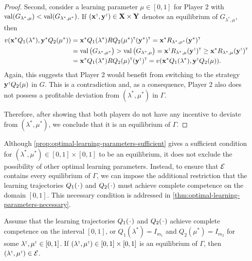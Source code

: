 \begin{proof}
        Second, consider a learning parameter $\mu \in [0, 1]$ for Player 2 with $\operatorname{val}(G_{\lambda^*, \mu}) < \operatorname{val}(G_{\lambda^*, \mu^*})$.
        If $(\vec{x}^\sdagger, \vec{y}^\sdagger) \in \vec{X} \times \vec{Y}$ denotes an equilibrium of $G_{\lambda^*, \mu}$, then
        \begin{equation} \label{temp:optimal-learning-parameters-sufficient-2}
        \begin{split}
            v(\vec{x}^* Q_1(\lambda^*), \vec{y}^* Q_2(\mu^*))
                & = \vec{x}^* Q_1(\lambda^*) R Q_2(\mu^*)^\transp (\vec{y}^*)^\transp
                = \vec{x}^* R_{\lambda^*, \mu^*} (\vec{y}^*)^\transp \\
                & = \val\big(G_{\lambda^*, \mu^*}\big)
                > \val\big(G_{\lambda^*, \mu}\big)
                = \vec{x}^\sdagger R_{\lambda^*, \mu} (\vec{y}^\sdagger)^\transp
                \ge \vec{x}^* R_{\lambda^*, \mu} (\vec{y}^\sdagger)^\transp \\
                & = \vec{x}^* Q_1(\lambda^*) R Q_2(\mu)^\transp (\vec{y}^\sdagger)^\transp
                = v(\vec{x}^* Q_1(\lambda^*), \vec{y}^\sdagger Q_2(\mu)).
        \end{split}
        \end{equation}
        Again, this suggests that Player 2 would benefit from switching to the strategy $\vec{y}^\sdagger Q_2(\mu)$ in $G$.
        This is a contradiction and, as a consequence, Player 2 also does not possess a profitable deviation from $(\lambda^*, \mu^*)$ in $\Gamma$.

        Therefore, after showing that both players do not have any incentive to deviate from $(\lambda^*, \mu^*)$, we conclude that it is an equilibrium of $\Gamma$.
    \end{proof}

    Although \autoref{prop:optimal-learning-parameters-sufficient} gives a sufficient condition for $(\lambda^*, \mu^*) \in [0, 1] \times [0, 1]$ to be an equilibrium, it does not exclude the possibility of other optimal learning parameters.
    Instead, to ensure that $\mathcal{E}$ contains every equilibrium of $\Gamma$, we can impose the additional restriction that the learning trajectories $Q_1(\funcdot)$ and $Q_2(\funcdot)$ must achieve complete competence on the domain $[0, 1]$.
    This necessary condition is addressed in \autoref{thm:optimal-learning-parameters-necessary}.

    \begin{theorem} \label{thm:optimal-learning-parameters-necessary}
        Assume that the learning trajectories $Q_1(\funcdot)$ and $Q_2(\funcdot)$ achieve complete competence on the interval $[0, 1]$, or $Q_1(\lambda^*) = I_{m_1}$ and $Q_2(\mu^*) = I_{m_2}$ for some $\lambda^\sdagger, \mu^\sdagger \in [0, 1]$.
        If $(\lambda^\sdagger, \mu^\sdagger) \in [0, 1] \times [0, 1]$ is an equilibrium of $\Gamma$, then $(\lambda^\sdagger, \mu^\sdagger) \in \scrE$.
    \end{theorem}

